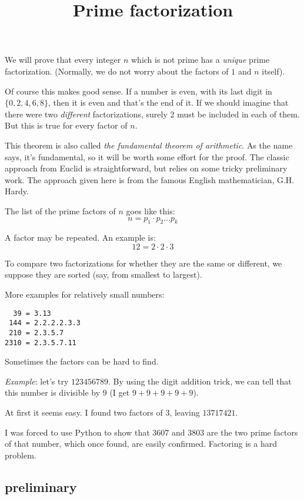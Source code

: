 \documentclass[11pt, oneside]{article}
\title{Prime factorization}
\date{}
\begin{document}
\maketitle
\Large


We will prove that every integer $n$ which is not prime has a \emph{unique} prime factorization.  (Normally, we do not worry about the factors of $1$ and $n$ itself). 

Of course this makes good sense.  If a number is even, with its last digit in $\{ 0, 2, 4, 6, 8 \}$, then it is even and that's the end of it.  If we should imagine that there were two \emph{different} factorizations, surely 2 must be included in each of them.  But this is true for every factor of $n$.

This theorem is also called \emph{the fundamental theorem of arithmetic}.  As the name says, it's fundamental, so it will be worth some effort for the proof.  The classic approach from Euclid is straightforward, but relies on some tricky preliminary work. The approach given here is from the famous English mathematician, G.H. Hardy.

The list of the prime factors of $n$ goes like this:
\[ n = p_1 \cdot p_2 \dots p_k \]

A factor may be repeated.  An example is:
\[ 12 = 2 \cdot 2 \cdot 3 \]

To compare two factorizations for whether they are the same or different, we suppose they are sorted (say, from smallest to largest).

More examples for relatively small numbers:
\begin{verbatim}
  39 = 3.13
 144 = 2.2.2.2.3.3
 210 = 2.3.5.7
2310 = 2.3.5.7.11
\end{verbatim}

Sometimes the factors can be hard to find.

\emph{Example}:  let's try $123456789$.  By using the digit addition trick, we can tell that this number is divisible by $9$ (I get $9 + 9 + 9 + 9 + 9$).

At first it seems easy.  I found two factors of $3$, leaving $13717421$.

I was forced to use Python to show that $3607$ and $3803$ are the two prime factors of that number, which once found, are easily confirmed.  Factoring is a hard problem.

\subsection*{preliminary}
\end{document}
